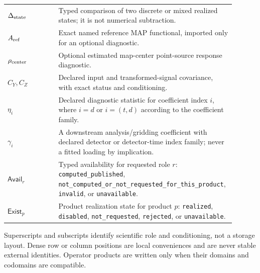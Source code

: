 \begin{longtable}{>{\raggedright\arraybackslash}p{0.22\linewidth}
                  >{\raggedright\arraybackslash}p{0.68\linewidth}}
$\Delta_{\rm state}$ & Typed comparison of two discrete or mixed realized states; it is not numerical subtraction. \\
$A_{\rm ref}$ & Exact named reference MAP functional, imported only for an optional diagnostic. \\
$\rho_{\rm center}$ & Optional estimated map-center point-source response diagnostic. \\
$C_Y,C_Z$ & Declared input and transformed-signal covariance, with exact status and conditioning. \\
$\eta_i$ & Declared diagnostic statistic for coefficient index $i$, where $i=d$ or $i=(t,d)$ according to the coefficient family. \\
$\gamma_i$ & A downstream analysis/gridding coefficient with declared detector or detector-time index family; never a fitted loading by implication. \\
$\mathsf{Avail}_{r}$ & Typed availability for requested role $r$: \texttt{computed\_published}, \nolinkurl{not_computed_or_not_requested_for_this_product}, \texttt{invalid}, or \texttt{unavailable}. \\
$\mathsf{Exist}_{p}$ & Product realization state for product $p$: \texttt{realized}, \texttt{disabled}, \texttt{not\_requested}, \texttt{rejected}, or \texttt{unavailable}. \\
\bottomrule
\end{longtable}

Superscripts and subscripts identify scientific role and conditioning, not a
storage layout. Dense row or column positions are local conveniences and are
never stable external identities. Operator products are written only when
their domains and codomains are compatible.
